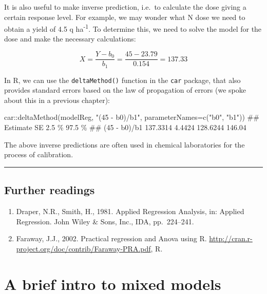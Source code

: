 \documentclass[a4paper,12pt,oneside]{book}
\providecommand{\tightlist}{%
  \setlength{\itemsep}{0pt}\setlength{\parskip}{0pt}}
\newenvironment{Shaded}{\begin{snugshade}}{\end{snugshade}}
\newcommand{\SpecialCharTok}[1]{#1}
\newcommand{\StringTok}[1]{#1}
\newcommand{\DocumentationTok}[1]{#1}
\newcommand{\FunctionTok}[1]{#1}
\newcommand{\AttributeTok}[1]{#1}
\newcommand{\NormalTok}[1]{#1}
\begin{document}
It is also useful to make inverse prediction, i.e.~to calculate the dose giving a certain response level. For example, we may wonder what N dose we need to obtain a yield of 4.5 q ha\textsuperscript{-1}. To determine this, we need to solve the model for the dose and make the necessary calculations:

\[X = \frac{Y - b_0}{b_1} = \frac{45 - 23.79}{0.154} = 137.33\]

In R, we can use the \texttt{deltaMethod()} function in the \texttt{car} package, that also provides standard errors based on the law of propagation of errors (we spoke about this in a previous chapter):

\begin{Shaded}
\begin{Highlighting}[]
\NormalTok{car}\SpecialCharTok{::}\FunctionTok{deltaMethod}\NormalTok{(modelReg, }\StringTok{"(45 {-} b0)/b1"}\NormalTok{, }
                 \AttributeTok{parameterNames=}\FunctionTok{c}\NormalTok{(}\StringTok{"b0"}\NormalTok{, }\StringTok{"b1"}\NormalTok{))}
\DocumentationTok{\#\#              Estimate       SE    2.5 \% 97.5 \%}
\DocumentationTok{\#\# (45 {-} b0)/b1 137.3314   4.4424 128.6244 146.04}
\end{Highlighting}
\end{Shaded}

The above inverse predictions are often used in chemical laboratories for the process of calibration.

\begin{center}\rule{0.5\linewidth}{0.5pt}\end{center}

\hypertarget{further-readings-9}{%
\section{Further readings}\label{further-readings-9}}

\begin{enumerate}
\def\labelenumi{\arabic{enumi}.}
\tightlist
\item
  Draper, N.R., Smith, H., 1981. Applied Regression Analysis, in: Applied Regression. John Wiley \& Sons, Inc., IDA, pp.~224--241.
\item
  Faraway, J.J., 2002. Practical regression and Anova using R. \url{http://cran.r-project.org/doc/contrib/Faraway-PRA.pdf}, R.
\end{enumerate}

\hypertarget{a-brief-intro-to-mixed-models}{%
\chapter{A brief intro to mixed models}\label{a-brief-intro-to-mixed-models}}
\end{document}
